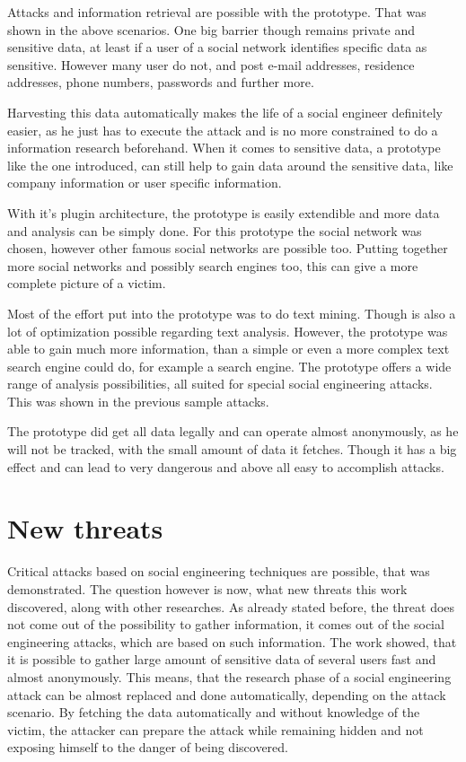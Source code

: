 Attacks and information retrieval are possible with the prototype. That was
shown in the above scenarios. One big barrier though remains private and
sensitive data, at least if a user of a social network identifies specific data
as sensitive. However many user do not, and post e-mail addresses, residence
addresses, phone numbers, passwords and further more.

Harvesting this data automatically makes the life of a social engineer
definitely easier, as he just has to execute the attack and is no more
constrained to do a information research beforehand. When it comes to sensitive
data, a prototype like the one introduced, can still help to gain data around
the sensitive data, like company information or user specific information.

With it's plugin architecture, the prototype is easily extendible and more data
and analysis can be simply done. For this prototype the \Twitter{} social
network was chosen, however other famous social networks are possible too.
Putting together more social networks and possibly search engines too, this can
give a more complete picture of a victim.

Most of the effort put into the prototype was to do text mining. Though is
also a lot of optimization possible regarding text analysis. However, the
prototype was able to gain much more information, than a simple or even a more
complex text search engine could do, for example a search engine. The prototype
offers a wide range of analysis possibilities, all suited for special social
engineering attacks. This was shown in the previous sample attacks.

The prototype did get all data legally and can operate almost anonymously, as
he will not be tracked, with the small amount of data it fetches. Though it has
a big effect and can lead to very dangerous and above all easy to accomplish
attacks.

\section{New threats}

Critical attacks based on social engineering techniques are possible, that was
demonstrated. The question however is now, what new threats this work
discovered, along with other researches. As already stated before, the threat
does not come out of the possibility to gather information, it comes out of the
social engineering attacks, which are based on such information. The work
showed, that it is possible to gather large amount of sensitive data of several
users fast and almost anonymously. This means, that the research phase of a
social engineering attack can be almost replaced and done automatically,
depending on the attack scenario. By fetching the data automatically and
without knowledge of the victim, the attacker can prepare the attack while
remaining hidden and not exposing himself to the danger of being discovered.


